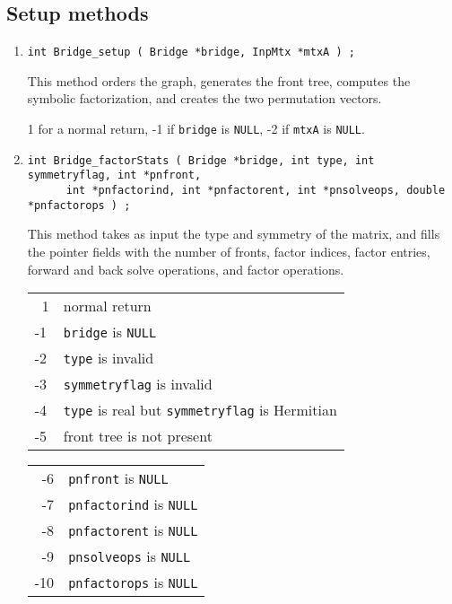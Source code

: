 \subsection{Setup methods}
\label{subsection:Bridge:proto:setup}
\par
\begin{enumerate}
\item
\begin{verbatim}
int Bridge_setup ( Bridge *bridge, InpMtx *mtxA ) ;
\end{verbatim}
This method orders the graph, generates the front tree, computes
the symbolic factorization, and creates the two permutation vectors.
\par {}
1 for a  normal return,
-1 if \texttt{bridge} is \texttt{NULL},
-2 if \texttt{mtxA} is \texttt{NULL}.
\item
\begin{verbatim}
int Bridge_factorStats ( Bridge *bridge, int type, int symmetryflag, int *pnfront,
      int *pnfactorind, int *pnfactorent, int *pnsolveops, double *pnfactorops ) ;
\end{verbatim}
This method takes as input the type and symmetry of the matrix,
and fills the pointer fields with the number of fronts, factor
indices, factor entries, forward and back solve operations,
and factor operations.
\par {}
\begin{center}
\begin{tabular}{ll}
~1 & normal return \\
-1 & \texttt{bridge} is \texttt{NULL} \\
-2 & \texttt{type} is invalid \\
-3 & \texttt{symmetryflag} is invalid \\
-4 & \texttt{type} is real but \texttt{symmetryflag} is Hermitian \\
-5 & front tree is not present
\end{tabular}
\begin{tabular}{ll}
~-6 & \texttt{pnfront} is \texttt{NULL}  \\
~-7 & \texttt{pnfactorind} is \texttt{NULL}  \\
~-8 & \texttt{pnfactorent} is \texttt{NULL}  \\
~-9 & \texttt{pnsolveops} is \texttt{NULL}  \\
-10 & \texttt{pnfactorops} is \texttt{NULL} 
\end{tabular}
\end{center}
\end{enumerate}
\par
